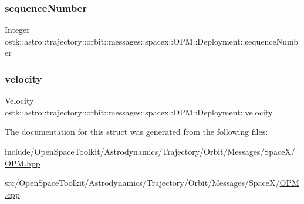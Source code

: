 \subsubsection{\texorpdfstring{sequence\+Number}{sequenceNumber}}
{\footnotesize\ttfamily Integer ostk\+::astro\+::trajectory\+::orbit\+::messages\+::spacex\+::\+O\+P\+M\+::\+Deployment\+::sequence\+Number}

\mbox{\label{structostk_1_1astro_1_1trajectory_1_1orbit_1_1messages_1_1spacex_1_1_o_p_m_1_1_deployment_a167c36d39b65f448bc5c9fd8d2238a9a}} 
\subsubsection{\texorpdfstring{velocity}{velocity}}
{\footnotesize\ttfamily Velocity ostk\+::astro\+::trajectory\+::orbit\+::messages\+::spacex\+::\+O\+P\+M\+::\+Deployment\+::velocity}



The documentation for this struct was generated from the following files\+:\begin{DoxyCompactItemize}
\item 
include/\+Open\+Space\+Toolkit/\+Astrodynamics/\+Trajectory/\+Orbit/\+Messages/\+Space\+X/\hyperlink{_o_p_m_8hpp}{O\+P\+M.\+hpp}\item 
src/\+Open\+Space\+Toolkit/\+Astrodynamics/\+Trajectory/\+Orbit/\+Messages/\+Space\+X/\hyperlink{_o_p_m_8cpp}{O\+P\+M.\+cpp}\end{DoxyCompactItemize}
